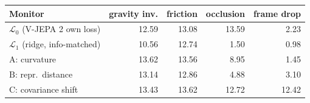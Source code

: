 \begin{tabular}{lrrrr}
\toprule
Monitor & gravity inv. & friction & occlusion & frame drop \\
\midrule
$\mathcal{L}_0$ (V-JEPA 2 own loss) & 12.59 & 13.08 & 13.59 & 2.23 \\
$\mathcal{L}_1$ (ridge, info-matched) & 10.56 & 12.74 & 1.50 & 0.98 \\
\midrule
$\mathrm{A}$: curvature & 13.62 & 13.56 & 8.95 & 1.45 \\
$\mathrm{B}$: repr.\ distance & 13.14 & 12.86 & 4.88 & 3.10 \\
$\mathrm{C}$: covariance shift & 13.43 & 13.62 & 12.72 & 12.42 \\
\bottomrule
\end{tabular}
